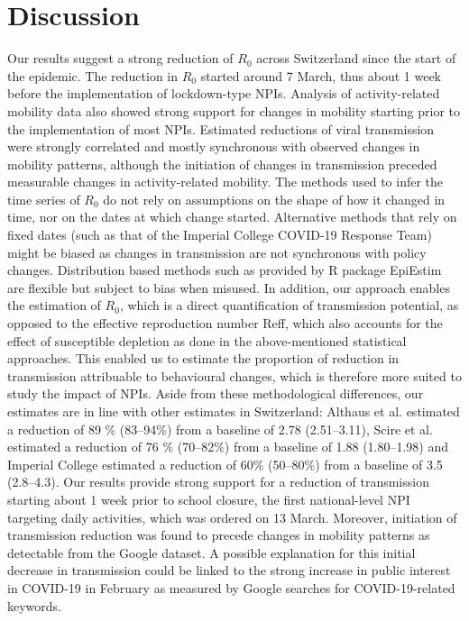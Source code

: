 \section{Discussion}
Our results suggest a strong reduction of $R_0$ across Switzerland since the start of the epidemic. The reduction in $R_0$ started around 7 March, thus about 1 week before the implementation of lockdown-type NPIs. Analysis of activity-related mobility data also showed strong support for changes in mobility starting prior to the implementation of most NPIs. Estimated reductions of viral transmission were strongly correlated and mostly synchronous with observed changes in mobility patterns, although the initiation of changes in transmission preceded measurable changes in activity-related mobility. The methods used to infer the time series of $R_0$ do not rely on assumptions on the shape of how it changed in time, nor on the dates at which change started. Alternative methods that rely on fixed dates (such as that of the Imperial College COVID-19 Response Team\cite{Flaxman:Report13Estimating:2020}) might be biased as changes in transmission are not synchronous with policy changes. Distribution based methods such as provided by R package EpiEstim\cite{Wallinga:DifferentEpidemicCurves:2004,Cori:NewFrameworkSoftware:2013} are flexible but subject to bias when misused\cite{Lipsitch:CommentPanLiu:2020}. In addition, our approach enables the estimation of $R_0$, which is a direct quantification of transmission potential, as opposed to the effective reproduction number Reff, which also accounts for the effect of susceptible depletion as done in the above-mentioned statistical approaches. This enabled us to estimate the proportion of reduction in transmission attribuable to behavioural changes, which is therefore more suited to study the impact of NPIs. Aside from these methodological differences, our estimates are in line with other estimates in Switzerland: Althaus et al.\cite{Althaus:RealtimeModelingProjections:2020} estimated a reduction of 89 \% (83–94\%) from a baseline of 2.78 (2.51–3.11), Scire et al.\cite{Scire:ReproductiveNumberCOVID19:2020} estimated a reduction of 76 \% (70–82\%) from a baseline of 1.88 (1.80–1.98) and Imperial College estimated a reduction of 60\% (50–80\%) from a baseline of 3.5 (2.8–4.3)\cite{Flaxman:Report13Estimating:2020}. Our results provide strong support for a reduction of transmission starting about 1 week prior to school closure, the first national-level NPI targeting daily activities, which was ordered on 13 March. Moreover, initiation of transmission reduction was found to precede changes in mobility patterns as detectable from the Google dataset. A possible explanation for this initial decrease in transmission could be linked to the strong increase in public interest in COVID-19 in February as measured by Google searches for COVID-19-related keywords.

